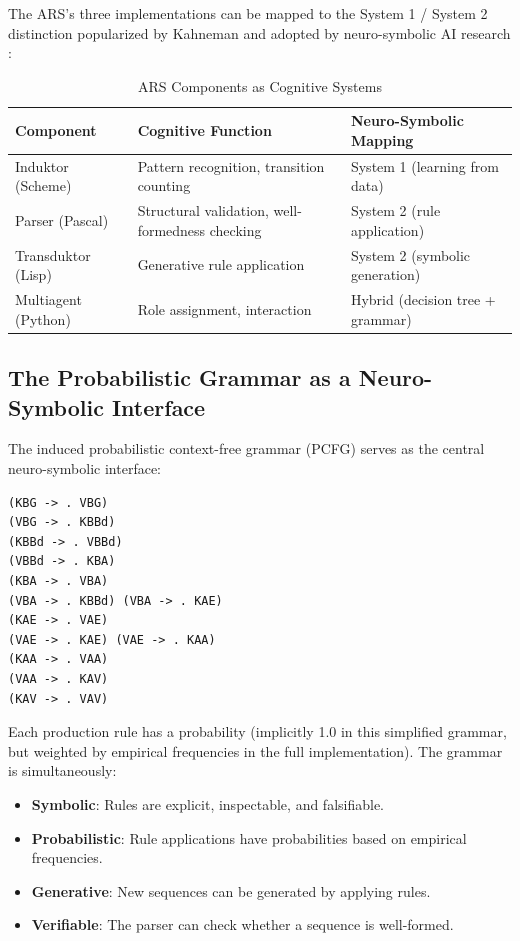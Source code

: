 \documentclass[12pt,a4paper]{article}
\begin{document}
The ARS's three implementations can be mapped to the System 1 / System 2 
distinction popularized by Kahneman \citep{kahneman2011thinking} and adopted 
by neuro-symbolic AI research \citep{marcus2020next}:

\begin{table}[H]
\centering
\caption{ARS Components as Cognitive Systems}
\label{tab:cognitive}
\begin{tabular}{@{} p{3cm} p{4cm} p{6cm} @{}}
\toprule
\textbf{Component} & \textbf{Cognitive Function} & \textbf{Neuro-Symbolic Mapping} \\
\midrule
Induktor (Scheme) & Pattern recognition, transition counting & System 1 (learning from data) \\
Parser (Pascal) & Structural validation, well-formedness checking & System 2 (rule application) \\
Transduktor (Lisp) & Generative rule application & System 2 (symbolic generation) \\
Multiagent (Python) & Role assignment, interaction & Hybrid (decision tree + grammar) \\
\bottomrule
\end{tabular}
\end{table}

\subsection{The Probabilistic Grammar as a Neuro-Symbolic Interface}

The induced probabilistic context-free grammar (PCFG) serves as the central 
neuro-symbolic interface:

\begin{verbatim}
(KBG -> . VBG)
(VBG -> . KBBd)
(KBBd -> . VBBd)
(VBBd -> . KBA)
(KBA -> . VBA)
(VBA -> . KBBd) (VBA -> . KAE)
(KAE -> . VAE)
(VAE -> . KAE) (VAE -> . KAA)
(KAA -> . VAA)
(VAA -> . KAV)
(KAV -> . VAV)
\end{verbatim}

Each production rule has a probability (implicitly 1.0 in this simplified 
grammar, but weighted by empirical frequencies in the full implementation). 
The grammar is simultaneously:

\begin{itemize}
    \item \textbf{Symbolic}: Rules are explicit, inspectable, and falsifiable.
    \item \textbf{Probabilistic}: Rule applications have probabilities based 
    on empirical frequencies.
    \item \textbf{Generative}: New sequences can be generated by applying rules.
    \item \textbf{Verifiable}: The parser can check whether a sequence is 
    well-formed.
\end{itemize}
\end{document}
